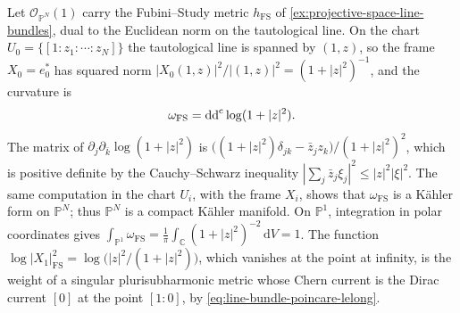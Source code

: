 \begin{example}\label{ex:projective-fubini-study-curvature}
Let $\mathcal O_{\mathbb P^N}(1)$ carry the Fubini--Study metric $h_{\mathrm{FS}}$ of \cref{ex:projective-space-line-bundles}, dual to the Euclidean norm on the tautological line. On the chart $U_0=\{[1:z_1:\cdots:z_N]\}$ the tautological line is spanned by $(1,z)$, so the frame $X_0=e_0^*$ has squared norm $|X_0(1,z)|^2/|(1,z)|^2=(1+|z|^2)^{-1}$, and the curvature is
\[
 \omega_{\mathrm{FS}}=\mathrm{dd}^{\mathrm{c}}\log(1+|z|^2).
\]
The matrix of $\partial_j\partial_{\bar k}\log(1+|z|^2)$ is $\bigl((1+|z|^2)\delta_{jk}-\bar z_jz_k\bigr)/(1+|z|^2)^2$, which is positive definite by the Cauchy--Schwarz inequality $|\sum_j\bar z_j\xi_j|^2\leq|z|^2|\xi|^2$. The same computation in the chart $U_i$, with the frame $X_i$, shows that $\omega_{\mathrm{FS}}$ is a K\"ahler form on $\mathbb P^N$; thus $\mathbb P^N$ is a compact K\"ahler manifold. On $\mathbb P^1$, integration in polar coordinates gives $\int_{\mathbb P^1}\omega_{\mathrm{FS}}=\frac1\pi\int_{\mathbb C}(1+|z|^2)^{-2}\,\mathrm dV=1$. The function $\log|X_1|_{\mathrm{FS}}^2=\log\bigl(|z|^2/(1+|z|^2)\bigr)$, which vanishes at the point at infinity, is the weight of a singular plurisubharmonic metric whose Chern current is the Dirac current $[0]$ at the point $[1:0]$, by \eqref{eq:line-bundle-poincare-lelong}.
\end{example}

